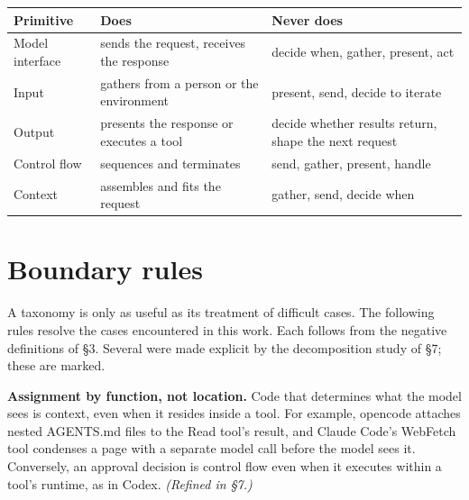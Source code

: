 {\def\LTcaptype{none} 
\begin{longtable}[]{@{}
  >{\raggedright\arraybackslash}p{}
  >{\raggedright\arraybackslash}p{}
  >{\raggedright\arraybackslash}p{}@{}}
\toprule\noalign{}
\begin{minipage}[b]{\linewidth}\raggedright
Primitive
\end{minipage} & \begin{minipage}[b]{\linewidth}\raggedright
Does
\end{minipage} & \begin{minipage}[b]{\linewidth}\raggedright
Never does
\end{minipage} \\
\midrule\noalign{}
\endhead
\bottomrule\noalign{}
\endlastfoot
Model interface & sends the request, receives the response & decide when, gather, present, act \\
Input & gathers from a person or the environment & present, send, decide to iterate \\
Output & presents the response or executes a tool & decide whether results return, shape the next request \\
Control flow & sequences and terminates & send, gather, present, handle \\
Context & assembles and fits the request & gather, send, decide when \\
\end{longtable}
}

\section{Boundary rules}

A taxonomy is only as useful as its treatment of difficult cases. The following rules resolve the cases encountered in this work. Each follows from the negative definitions of §3. Several were made explicit by the decomposition study of §7; these are marked.

\textbf{Assignment by function, not location.} Code that determines what the model sees is context, even when it resides inside a tool. For example, opencode attaches nested AGENTS.md files to the Read tool's result, and Claude Code's WebFetch tool condenses a page with a separate model call before the model sees it. Conversely, an approval decision is control flow even when it executes within a tool's runtime, as in Codex. \emph{(Refined in §7.)}

